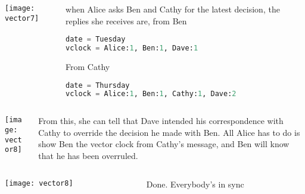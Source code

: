 \documentclass[aspectratio=169, 15pt,usenames,dvipsnames]{beamer}
\begin{document}
{\begin{gdblank}
\begin{columns}
\begin{column}{0.5\textwidth}
\begin{lstlisting}[language=Python]
			\end{lstlisting}
		\end{column}	
	\end{columns} 
	\end{gdblank}
	\cprotEnv\begin{gdblank}
	\begin{columns}
		\begin{column}{0.5\textwidth}
			\texttt{[image: vector7]}			
		\end{column}
		\begin{column}{0.5\textwidth}				
			when Alice asks Ben and Cathy for the latest decision, the replies she receives are, from Ben
			\begin{lstlisting}[language=Python]
date = Tuesday
vclock = Alice:1, Ben:1, Dave:1
			\end{lstlisting}
			From Cathy
			\begin{lstlisting}[language=Python]
date = Thursday
vclock = Alice:1, Ben:1, Cathy:1, Dave:2
			\end{lstlisting}
		\end{column}	
	\end{columns} 
	\end{gdblank}
	\cprotEnv\begin{gdblank}
	\begin{columns}
		\begin{column}{0.5\textwidth}
			\texttt{[image: vector8]}			
		\end{column}
		\begin{column}{0.5\textwidth}				
			From this, she can tell that Dave intended his correspondence with Cathy to override the decision he made with Ben. All Alice has to do is show Ben the vector clock from Cathy’s message, and Ben will know that he has been overruled.
		\end{column}	
	\end{columns} 
	\end{gdblank}
	\cprotEnv\begin{gdblank}
	\begin{columns}
		\begin{column}{0.5\textwidth}
			\texttt{[image: vector8]}			
		\end{column}
		\begin{column}{0.5\textwidth}				
			Done. Everybody's in sync
		\end{column}	
	\end{columns} 
	\end{gdblank}
}
\end{document}
